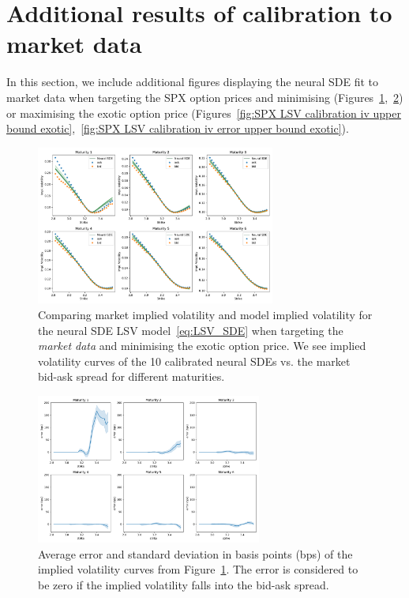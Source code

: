 \section{Additional results of calibration to market data}\label{apx:calibration market data}
In this section, we include additional figures displaying the neural SDE fit to market data when targeting the SPX option prices and minimising (Figures~\ref{fig:SPX LSV calibration iv lower bound exotic},~\ref{fig:SPX LSV calibration iv error lower bound exotic}) or maximising the exotic option price (Figures~\ref{fig:SPX LSV calibration iv upper bound exotic},~\ref{fig:SPX LSV calibration iv error upper bound exotic}). 

\begin{figure}[H]
  \centering 
	\includegraphics[clip, width=0.7\textwidth]{content/reschap1/Figures/figures_SPX/iv_nsde_lower_bound.pdf}
  \caption{Comparing market implied volatility and model implied volatility for the neural SDE LSV model~\eqref{eq:LSV_SDE} when targeting the {\em market data} and minimising the exotic option price.
We see implied volatility curves of the 10 calibrated neural SDEs vs. the market bid-ask spread for different maturities.
}
\label{fig:SPX LSV calibration iv lower bound exotic}  
\end{figure}


\begin{figure}[H]
  \centering 
	\includegraphics[clip, width=0.66\textwidth]{content/reschap1/Figures/figures_SPX/iv_error_lower_bound.pdf}
  \caption{Average error and standard deviation in basis points (bps) of the implied volatility curves from Figure~\ref{fig:SPX LSV calibration iv lower bound exotic}. The error is considered to be zero if the implied volatility falls into the bid-ask spread.
}
\label{fig:SPX LSV calibration iv error lower bound exotic}  
\end{figure}


